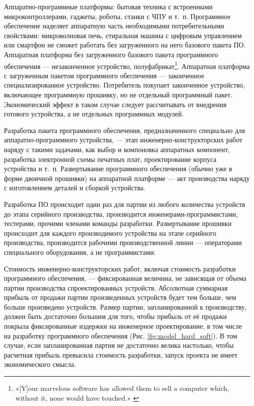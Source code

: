 \documentclass{article}
\begin{document}
Аппаратно-программные платформы: бытовая техника с встроенными микроконтроллерами, гаджеты, роботы, станки с ЧПУ и т.~п. Программное обеспечение наделяет аппаратную часть необходимыми потребительными свойствами: микроволновая печь, стиральная машина с цифровым управлением или смартфон не сможет работать без загруженного на него базового пакета ПО. Аппаратная платформа без загруженного базового пакета программного обеспечения — незаконченное устройство, полуфабрикат\footnote{«[Y]our marvelous software has allowed them to sell a computer which, without it, none would have touched.» \cite{driscollOpenLetter}}. Аппаратная платформа с загруженным пакетом программного обеспечения — законченное специализированное устройство. Потребитель покупает законченное устройство, включающее программную прошивку, но не отдельный программный пакет. Экономический эффект в таком случае следует рассчитывать от внедрения готового устройства, а не отдельных программных модулей.

Разработка пакета программного обеспечения, предназначенного специально для аппаратно-программного устройства, — этап инженерно-конструкторских работ наряду с такими задачами, как выбор и компоновка аппаратных компонент, разработка электронной схемы печатных плат, проектирование корпуса устройства и т.~п. Развертывание программного обеспечения (обычно уже в форме двоичной прошивки) на аппаратной платформе — акт производства наряду с изготовлением деталей и сборкой устройства. 

Разработка ПО происходит один раз для партии из любого количества устройств до этапа серийного производства, производится инженерами-программистами, тестерами, прочими членами команды разработки. Развертывание прошивки происходит для каждого производимого устройства на этапе серийного производства, производится рабочими производственной линии — операторами специального оборудования, а не программистами.

Стоимость инженерно-конструкторских работ, включая стоимость разработки программного обеспечения, — фиксированная величина, не зависящая от объема партии производства спроектированных устройств. Абсолютная суммарная прибыль от продажи партии произведенных устройств будет тем больше, чем больше произведено устройств. Размер партии, запланированной к производству, должен быть достаточно большим для того, чтобы прибыль от её продажи покрыла фиксированные издержки на инженерное проектирование, в том числе на разработку программного обеспечения (Рис. \ref{fig:model_hard_soft}). В том случае, если запланированная партия не достаточно велика настолько, чтобы расчетная прибыль превысила стоимость разработки, запуск проекта не имеет экономического смысла.
\end{document}
